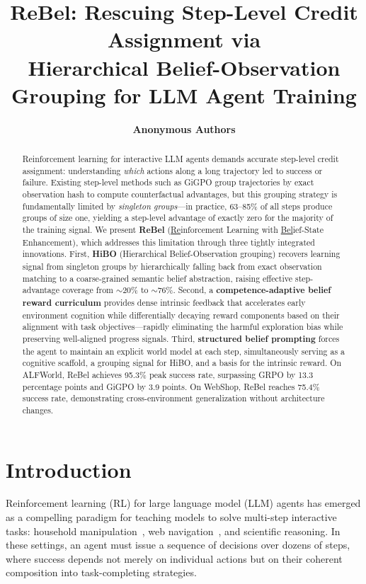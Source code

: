 \documentclass{article}
\title{ReBel: Rescuing Step-Level Credit Assignment via \\
  Hierarchical Belief-Observation Grouping for LLM Agent Training}
\author{%
  \textbf{Anonymous Authors}
}
\begin{document}
\maketitle

\begin{abstract}
Reinforcement learning for interactive LLM agents demands accurate step-level
credit assignment: understanding \emph{which} actions along a long trajectory
led to success or failure.
Existing step-level methods such as GiGPO group trajectories by exact observation
hash to compute counterfactual advantages, but this grouping strategy is
fundamentally limited by \emph{singleton groups}---in practice, 63--85\% of
all steps produce groups of size one, yielding a step-level advantage of exactly
zero for the majority of the training signal.
We present \textbf{ReBel} (\underline{Re}inforcement Learning with
\underline{Bel}ief-State Enhancement), which addresses this limitation through
three tightly integrated innovations.
First, \textbf{HiBO} (Hierarchical Belief-Observation grouping) recovers
learning signal from singleton groups by hierarchically falling back from exact
observation matching to a coarse-grained semantic belief abstraction, raising
effective step-advantage coverage from $\sim$20\% to $\sim$76\%.
Second, a \textbf{competence-adaptive belief reward curriculum} provides dense
intrinsic feedback that accelerates early environment cognition while
differentially decaying reward components based on their alignment with task
objectives---rapidly eliminating the harmful exploration bias while preserving
well-aligned progress signals.
Third, \textbf{structured belief prompting} forces the agent to maintain an
explicit world model at each step, simultaneously serving as a cognitive
scaffold, a grouping signal for HiBO, and a basis for the intrinsic reward.
On ALFWorld, ReBel achieves 95.3\% peak success rate, surpassing GRPO by
13.3 percentage points and GiGPO by 3.9 points.
On WebShop, ReBel reaches 75.4\% success rate, demonstrating cross-environment
generalization without architecture changes.
\end{abstract}


\section{Introduction}
\label{sec:intro}

Reinforcement learning (RL) for large language model (LLM) agents has emerged as
a compelling paradigm for teaching models to solve multi-step interactive tasks:
household manipulation~\citep{shridhar2021alfworld}, web navigation~\citep{yao2022webshop},
and scientific reasoning.
In these settings, an agent must issue a sequence of decisions over dozens of
steps, where success depends not merely on individual actions but on their
coherent composition into task-completing strategies.
\end{document}

